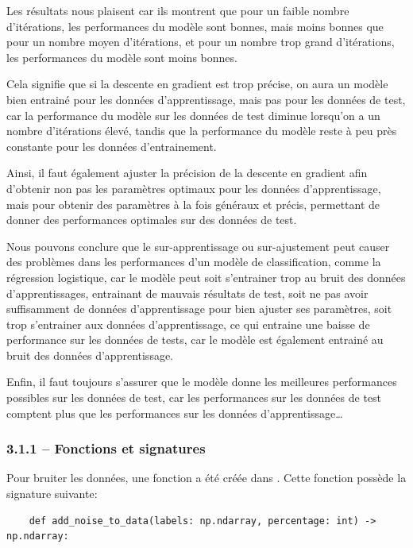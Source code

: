 \documentclass[
]{article}
\begin{document}
Les résultats nous plaisent car ils montrent que pour un faible nombre
d'itérations, les performances du modèle sont bonnes, mais moins bonnes
que pour un nombre moyen d'itérations, et pour un nombre trop grand
d'itérations, les performances du modèle sont moins bonnes.

Cela signifie que si la descente en gradient est trop précise, on aura
un modèle bien entrainé pour les données d'apprentissage, mais pas pour
les données de test, car la performance du modèle sur les données de
test diminue lorsqu'on a un nombre d'itérations élevé, tandis que la
performance du modèle reste à peu près constante pour les données
d'entrainement.

Ainsi, il faut également ajuster la précision de la descente en gradient
afin d'obtenir non pas les paramètres optimaux pour les données
d'apprentissage, mais pour obtenir des paramètres à la fois généraux et
précis, permettant de donner des performances optimales sur des données
de test.

Nous pouvons conclure que le sur-apprentissage ou sur-ajustement peut
causer des problèmes dans les performances d'un modèle de
classification, comme la régression logistique, car le modèle peut soit
s'entrainer trop au bruit des données d'apprentissages, entrainant de
mauvais résultats de test, soit ne pas avoir suffisamment de données
d'apprentissage pour bien ajuster ses paramètres, soit trop s'entrainer
aux données d'apprentissage, ce qui entraine une baisse de performance
sur les données de tests, car le modèle est également entrainé au bruit
des données d'apprentissage.

Enfin, il faut toujours s'assurer que le modèle donne les meilleures
performances possibles sur les données de test, car les performances sur
les données de test comptent plus que les performances sur les données
d'apprentissage\ldots{}

\subsubsection{3.1.1 -- Fonctions et
signatures}\label{fonctions-et-signatures}

Pour bruiter les données, une fonction a été créée dans
. Cette fonction possède la signature suivante:

\begin{lstlisting}
    def add_noise_to_data(labels: np.ndarray, percentage: int) -> np.ndarray:
\end{lstlisting}
\end{document}
